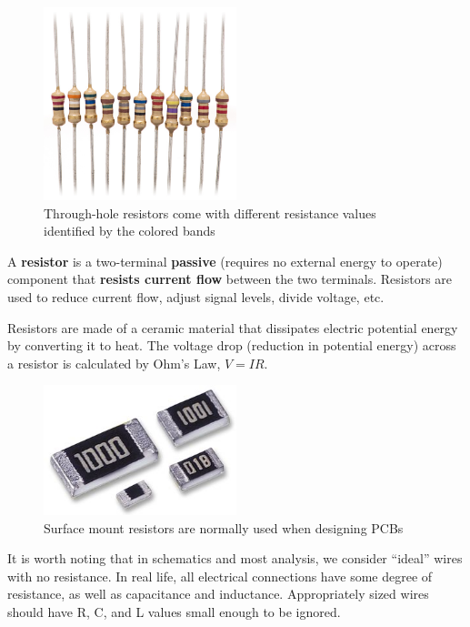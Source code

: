 \documentclass{article}
\begin{document}
\begin{figure}[h]
    \centering
    \includegraphics[width=0.5\textwidth]{img/resistors-thru-hole.jpg}
    \caption{Through-hole resistors come with different resistance values identified by the colored bands}
    \label{fig:res-thru}
\end{figure}

A \textbf{resistor} is a two-terminal \textbf{passive} (requires no external energy to operate) component that \textbf{resists current flow}
between the two terminals. Resistors are used to reduce current flow, adjust signal levels, divide voltage, etc. 

Resistors are made of a ceramic material that dissipates electric potential energy by converting it to heat.
The voltage drop (reduction in potential energy) across a resistor is calculated by Ohm's Law, $V=IR$.

\begin{figure}[h]
    \centering
    \includegraphics[width=0.5\textwidth]{img/resistors-smd.jpg}
    \caption{Surface mount resistors are normally used when designing PCBs}
    \label{fig:res-smd}
\end{figure}

It is worth noting that in schematics and most analysis, we consider ``ideal'' wires with no resistance. In real life, all electrical connections have some degree
of resistance, as well as capacitance and inductance. Appropriately sized wires should have R, C, and L values small enough to be ignored.
\end{document}
